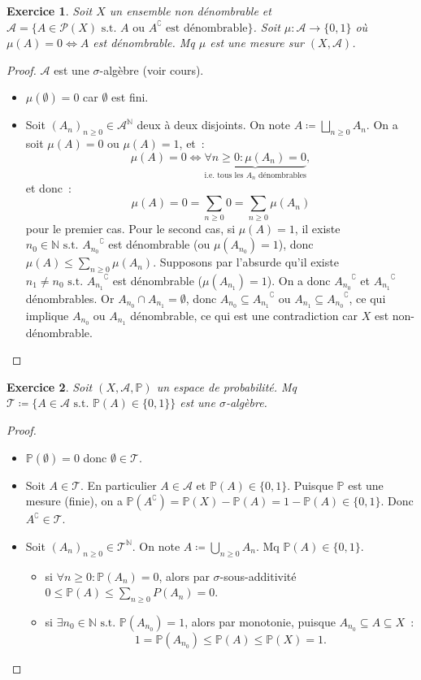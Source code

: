 \documentclass{article}
\newtheorem{ex}{Exercice}[section]
\theoremstyle{definition}
\newcommand{\st}{\text{ s.t. }}
\newcommand{\C}{\complement}
\newcommand{\N}{{\mathbb N}}
\renewcommand{\P}{{\mathbb P}}
\begin{document}
\begin{ex} Soit $X$ un ensemble non dénombrable et $\mathcal A = \{A \in \mathcal P(X) \st A \text{ ou } A^\C \text{ est dénombrable}\}$. Soit $\mu : \mathcal A \to \{0, 1\}$
où $\mu(A) = 0 \iff A$ est dénombrable. Mq $\mu$ est une mesure sur $(X, \mathcal A)$.
\end{ex}

\begin{proof} $\mathcal A$ est une $\sigma$-algèbre (voir cours).
\begin{itemize}
	\item $\mu(\emptyset) = 0$ car $\emptyset$ est fini.
	\item Soit $(A_n)_{n \geq 0} \in \mathcal A^\N$ deux à deux disjoints. On note $A \coloneqq \bigsqcup_{n \geq 0}A_n$. On a soit $\mu(A) = 0$ ou $\mu(A) = 1$, et~:
	\[\mu(A) = 0 \iff \underbrace {\forall n \geq 0 : \mu(A_n) = 0}_{\text{i.e. tous les $A_n$ dénombrables}},\]
	et donc~:
	\[\mu(A) = 0 = \sum_{n \geq 0}0 = \sum_{n \geq 0}\mu(A_n)\]
	pour le premier cas. Pour le second cas, si $\mu(A) = 1$, il existe $n_0 \in \N \st {A_{n_0}}^\C$ est dénombrable (ou $\mu(A_{n_0}) = 1$), donc $\mu(A) \leq \sum_{n \geq 0}\mu(A_n)$.
	Supposons par l'absurde qu'il existe $n_1 \neq n_0 \st {A_{n_1}}^\C$ est dénombrable ($\mu(A_{n_1}) = 1$). On a donc ${A_{n_0}}^\C$ et ${A_{n_1}}^\C$ dénombrables.
	Or $A_{n_0} \cap A_{n_1} = \emptyset$, donc 	$A_{n_0} \subseteq {A_{n_1}}^\C$ ou $A_{n_1} \subseteq {A_{n_0}}^\C$, ce qui implique $A_{n_0}$ ou $A_{n_1}$ dénombrable,
	ce qui est une contradiction car $X$ est non-dénombrable.
\end{itemize}
\end{proof}

\begin{ex} Soit $(X, \mathcal A, \P)$ un espace de probabilité. Mq $\mathcal T \coloneqq \{A \in \mathcal A \st \P(A) \in \{0, 1\}\}$ est une $\sigma$-algèbre.
\end{ex}

\begin{proof}~
\begin{itemize}
	\item $\P(\emptyset) = 0$ donc $\emptyset \in \mathcal T$.
	\item Soit $A \in \mathcal T$. En particulier $A \in \mathcal A$ et $\P(A) \in \{0, 1\}$. Puisque $\P$ est une mesure (finie), on a
	$\P(A^\C) = \P(X) - \P(A) = 1 - \P(A) \in \{0, 1\}$. Donc $A^\C \in \mathcal T$.
	\item Soit $(A_n)_{n \geq 0} \in \mathcal T^\N$. On note $A \coloneqq \bigcup_{n \geq 0}A_n$. Mq $\P(A) \in \{0, 1\}$.
	\begin{itemize}
		\item si $\forall n \geq 0 : \P(A_n) = 0$, alors par $\sigma$-sous-additivité $0 \leq \P(A) \leq \sum_{n \geq 0}P(A_n) = 0$.
		\item si $\exists n_0 \in \N \st \P(A_{n_0}) = 1$, alors par monotonie, puisque $A_{n_0} \subseteq A \subseteq X$~:
		\[1 = \P(A_{n_0}) \leq \P(A) \leq \P(X) = 1.\]
	\end{itemize}
\end{itemize}
\end{proof}
\end{document}
